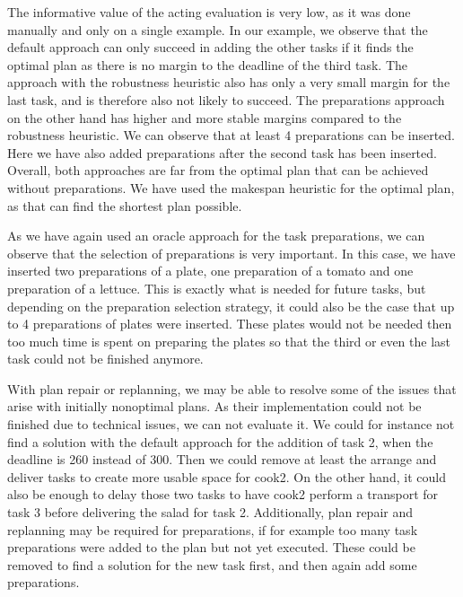 The informative value of the acting evaluation is very low, as it was done manually and only on a single example.
In our example, we observe that the default approach can only succeed in adding the other tasks if it finds the optimal plan as there is no margin to the deadline of the third task.
The approach with the robustness heuristic also has only a very small margin for the last task, and is therefore also not likely to succeed.
The preparations approach on the other hand has higher and more stable margins compared to the robustness heuristic.
We can observe that at least 4 preparations can be inserted.
Here we have also added preparations after the second task has been inserted.
Overall, both approaches are far from the optimal plan that can be achieved without preparations.
We have used the makespan heuristic for the optimal plan, as that can find the shortest plan possible.

As we have again used an oracle approach for the task preparations, we can observe that the selection of preparations is very important.
In this case, we have inserted two preparations of a plate, one preparation of a tomato and one preparation of a lettuce.
This is exactly what is needed for future tasks, but depending on the preparation selection strategy, it could also be the case that up to 4 preparations of plates were inserted.
These plates would not be needed then too much time is spent on preparing the plates so that the third or even the last task could not be finished anymore.

With plan repair or replanning, we may be able to resolve some of the issues that arise with initially nonoptimal plans.
As their implementation could not be finished due to technical issues, we can not evaluate it.
We could for instance not find a solution with the default approach for the addition of task 2, when the deadline is 260 instead of 300.
Then we could remove at least the arrange and deliver tasks to create more usable space for cook2.
On the other hand, it could also be enough to delay those two tasks to have cook2 perform a transport for task 3 before delivering the salad for task 2.
Additionally, plan repair and replanning may be required for preparations, if for example too many task preparations were added to the plan but not yet executed.
These could be removed to find a solution for the new task first, and then again add some preparations.

